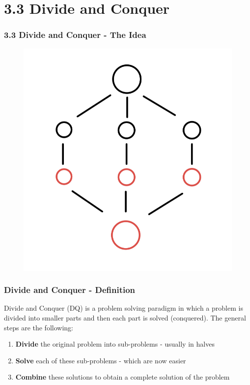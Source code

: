 \documentclass{beamer}
\begin{document}
\section{3.3 Divide and Conquer}

\begin{frame}[fragile]
\frametitle{3.3 Divide and Conquer - The Idea}

\begin{figure}
    \centering
    \includegraphics[scale=0.25]{imgs/divide_and_conquer.jpeg}
\end{figure}

\end{frame}

\begin{frame}[fragile]
\frametitle{Divide and Conquer - Definition}

Divide and Conquer (DQ) is a problem solving paradigm in which a problem is divided into smaller parts and then each part is solved (conquered). The general steps are the following:
\vspace{0.3cm}
\begin{enumerate}
    \item \textbf{Divide} the original problem into sub-problems - usually in halves
    \item \textbf{Solve} each of these sub-problems - which are now easier
    \item \textbf{Combine} these solutions to obtain a complete solution of the problem
\end{enumerate}

\end{frame}
\end{document}
